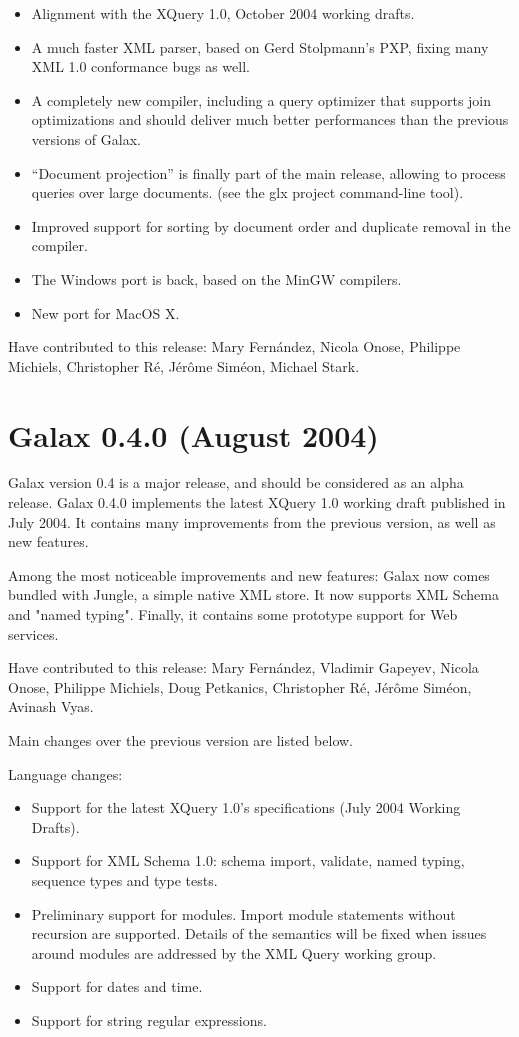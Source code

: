 \begin{itemize}
\item Alignment with the XQuery 1.0, October 2004 working drafts.
\item A much faster XML parser, based on Gerd Stolpmann's PXP, fixing
  many XML 1.0 conformance bugs as well.
\item A completely new compiler, including a query optimizer that
  supports join optimizations and should deliver much better
  performances than the previous versions of Galax.
\item ``Document projection'' is finally part of the main release,
  allowing to process queries over large documents. (see the
  glx project command-line tool).
\item Improved support for sorting by document order and duplicate
  removal in the compiler.
\item The Windows port is back, based on the MinGW compilers.
\item New port for MacOS X.
\end{itemize}

Have contributed to this release:
  Mary Fern\'andez, Nicola Onose, Philippe Michiels, Christopher R\'e,
  J\'er\^ome Sim\'eon, Michael Stark.

\section{Galax 0.4.0 (August 2004)}

Galax version 0.4 is a major release, and should be considered as an
alpha release. Galax 0.4.0 implements the latest XQuery 1.0 working
draft published in July 2004. It contains many improvements from the
previous version, as well as new features.

Among the most noticeable improvements and new features: Galax now
comes bundled with Jungle, a simple native XML store. It now supports
XML Schema and "named typing". Finally, it contains some prototype
support for Web services.

Have contributed to this release:
  Mary Fern\'andez, Vladimir Gapeyev, Nicola Onose, Philippe Michiels,
  Doug Petkanics, Christopher R\'e, J\'er\^ome Sim\'eon, Avinash Vyas.

Main changes over the previous version are listed below.

Language changes:
\begin{itemize}
\item Support for the latest XQuery 1.0's specifications (July 2004
  Working Drafts).
\item Support for XML Schema 1.0: schema import, validate, named typing,
  sequence types and type tests.
\item Preliminary support for modules. Import module statements without
  recursion are supported. Details of the semantics will be fixed when
  issues around modules are addressed by the XML Query working group.
\item Support for dates and time.
\item Support for string regular expressions.
\end{itemize}

